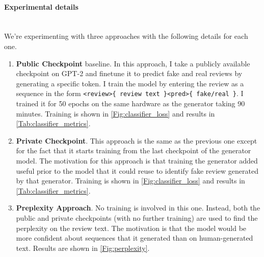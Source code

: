 \documentclass{article}
\begin{document}
\paragraph{Experimental details}$ $
\\We're experimenting with three approaches with the following details for each one.
\begin{enumerate}
\item \textbf{Public Checkpoint} baseline. In this approach, I take a publicly available checkpoint on GPT-2 and finetune it to predict fake and real reviews by generating a specific token. I train the model by entering the review as a sequence in the form \texttt{<review>\{ review text \}<pred>\{ fake/real \}<|endoftext|>}. I trained it for 50 epochs on the same hardware as the generator taking 90 minutes.  Training is shown in \ref{Fig:classifier_loss} and results in \ref{Tab:classifier_metrics}.
\item \textbf{Private Checkpoint}. This approach is the same as the previous one except for the fact that it starts training from the last checkpoint of the generator model. The motivation for this approach is that training the generator added useful prior to the model that it could reuse to identify fake review generated by that generator. Training is shown in \ref{Fig:classifier_loss} and results in \ref{Tab:classifier_metrics}.
\item \textbf{Preplexity Approach}.  No training is involved in this one. Instead, both the public and private checkpoints (with no further training) are used to find the perplexity on the review text. The motivation is that the model would be more confident about sequences that it generated than on human-generated text. Results are shown in \ref{Fig:perplexity}.
\end{enumerate}
\end{document}
